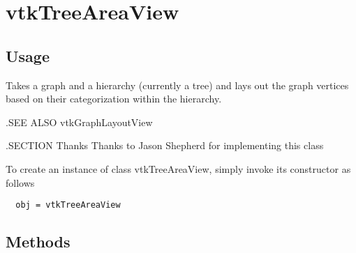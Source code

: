 \section{vtkTreeAreaView}

\subsection{Usage}

 Takes a graph and a hierarchy (currently a tree) and lays out the graph
 vertices based on their categorization within the hierarchy.

 .SEE ALSO
 vtkGraphLayoutView

 .SECTION Thanks
 Thanks to Jason Shepherd for implementing this class

To create an instance of class vtkTreeAreaView, simply
invoke its constructor as follows
\begin{verbatim}
  obj = vtkTreeAreaView
\end{verbatim}
\subsection{Methods}


